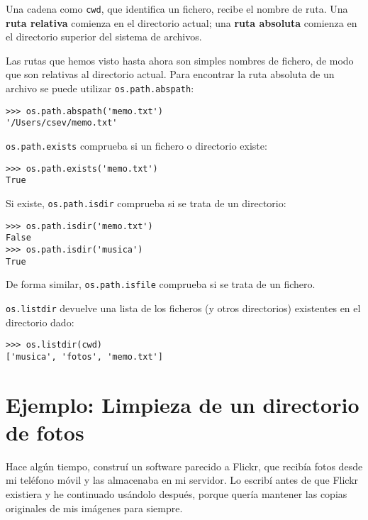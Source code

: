 
Una cadena como {\tt cwd}, que identifica un fichero, recibe el nombre de ruta.
Una {\bf ruta relativa} comienza en el directorio actual;
una {\bf ruta absoluta} comienza en el directorio superior del
sistema de archivos.


Las rutas que hemos visto hasta ahora son simples nombres de fichero, de modo que
son relativas al directorio actual. Para encontrar la ruta absoluta de
un archivo se puede utilizar {\tt os.path.abspath}:

\beforeverb
\begin{verbatim}
>>> os.path.abspath('memo.txt')
'/Users/csev/memo.txt'
\end{verbatim}
\afterverb
%
{\tt os.path.exists} comprueba
si un fichero o directorio existe:


\beforeverb
\begin{verbatim}
>>> os.path.exists('memo.txt')
True
\end{verbatim}
\afterverb
%
Si existe, {\tt os.path.isdir} comprueba si se trata de un directorio:

\beforeverb
\begin{verbatim}
>>> os.path.isdir('memo.txt')
False
>>> os.path.isdir('musica')
True
\end{verbatim}
\afterverb
%
De forma similar, {\tt os.path.isfile} comprueba si se trata de un fichero.

{\tt os.listdir} devuelve una lista de los ficheros (y otros directorios)
existentes en el directorio dado:

\beforeverb
\begin{verbatim}
>>> os.listdir(cwd)
['musica', 'fotos', 'memo.txt']
\end{verbatim}
\afterverb
%


\section{Ejemplo: Limpieza de un directorio de fotos}

Hace algún tiempo, construí un software parecido a Flickr, que
recibía fotos desde mi teléfono móvil y las almacenaba
en mi servidor. Lo escribí antes de que Flickr existiera y he continuado
usándolo después, porque quería mantener las copias originales
de mis imágenes para siempre.

